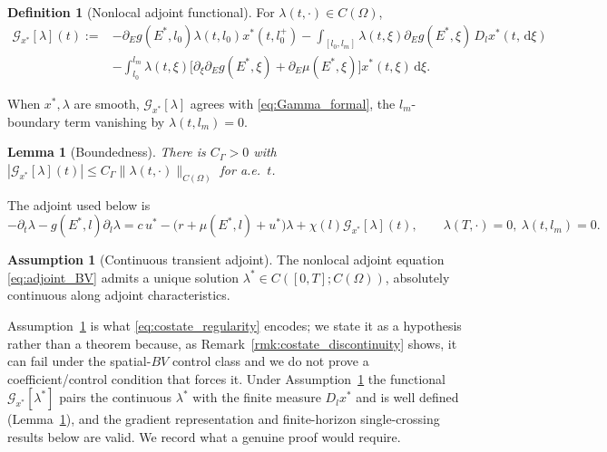 \documentclass[pdflatex,sn-mathphys-num]{sn-jnl}
\newcommand{\Om}{\Omega}
\newcommand{\dd}{\,\mathrm{d}}
\theoremstyle{plain}
\newtheorem{lemma}[theorem]{Lemma}
\theoremstyle{definition}
\newtheorem{definition}[theorem]{Definition}
\newtheorem{assumption}[theorem]{Assumption}
\theoremstyle{remark}
\begin{document}
\begin{definition}[Nonlocal adjoint functional]
\label{def:Gamma_BV}
For $\lambda(t,\cdot)\in C(\Om)$,
\begin{equation}\label{eq:Gamma_BV}
\begin{aligned}
\mathcal G_{x^*}[\lambda](t)
:={}&
-\partial_Eg(E^*,l_0)\lambda(t,l_0)x^*(t,l_0^+)
-\int_{[l_0,l_m]}\lambda(t,\xi)\partial_Eg(E^*,\xi)\,D_lx^*(t,\dd\xi)\\
&-\int_{l_0}^{l_m}\lambda(t,\xi)
\big[\partial_\xi\partial_Eg(E^*,\xi)+\partial_E\mu(E^*,\xi)\big]x^*(t,\xi)\dd\xi.
\end{aligned}
\end{equation}
\end{definition}

When $x^*,\lambda$ are smooth, $\mathcal G_{x^*}[\lambda]$ agrees with
\eqref{eq:Gamma_formal}, the $l_m$-boundary term vanishing by $\lambda(t,l_m)=0$.

\begin{lemma}[Boundedness]
\label{lem:Gamma_bounded}
There is $C_\Gamma>0$ with
$|\mathcal G_{x^*}[\lambda](t)|\le C_\Gamma\|\lambda(t,\cdot)\|_{C(\Om)}$ for a.e.\
$t$.
\end{lemma}

The adjoint used below is
\begin{equation}\label{eq:adjoint_BV}
-\partial_t\lambda-g(E^*,l)\partial_l\lambda
=
c\,u^*-\big(r+\mu(E^*,l)+u^*\big)\lambda+\chi(l)\mathcal G_{x^*}[\lambda](t),
\qquad
\lambda(T,\cdot)=0,\ \lambda(t,l_m)=0.
\end{equation}

\begin{assumption}[Continuous transient adjoint]
\label{ass:adjoint_exists}
The nonlocal adjoint equation \eqref{eq:adjoint_BV} admits a unique solution
$\lambda^*\in C([0,T];C(\Om))$, absolutely continuous along adjoint
characteristics.
\end{assumption}

Assumption~\ref{ass:adjoint_exists} is what \eqref{eq:costate_regularity} encodes;
we state it as a hypothesis rather than a theorem because, as
Remark~\ref{rmk:costate_discontinuity} shows, it can fail under the spatial-$BV$
control class and we do not prove a coefficient/control condition that forces it.
Under Assumption~\ref{ass:adjoint_exists} the functional
$\mathcal G_{x^*}[\lambda^*]$ pairs the continuous $\lambda^*$ with the finite
measure $D_lx^*$ and is well defined (Lemma~\ref{lem:Gamma_bounded}), and the
gradient representation and finite-horizon single-crossing results below are
valid. We record what a genuine proof would require.
\end{document}
